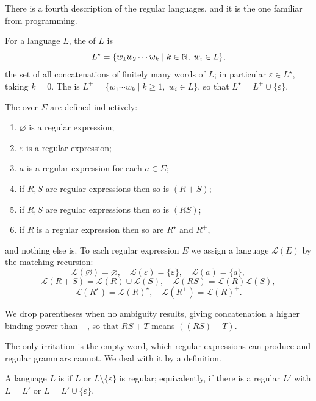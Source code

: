 \documentclass[a4paper]{scrartcl}
\newcommand{\lang}{\mathcal{L}}
\newcommand{\eps}{\varepsilon}
\begin{document}
There is a fourth description of the regular languages, and it is the one familiar from programming.

\begin{definition}
	For a language $L$, the  of $L$ is
	$$L^\star = \{w_1w_2\cdots w_k \mid k \in \mathbb{N},\; w_i \in L\},$$
	the set of all concatenations of finitely many words of $L$; in particular $\eps \in L^\star$, taking $k = 0$. The  is $L^+ = \{w_1\cdots w_k \mid k \geq 1,\; w_i \in L\}$, so that $L^\star = L^+ \cup \{\eps\}$.
\end{definition}

\begin{definition}
	The  over $\Sigma$ are defined inductively:
	\begin{enumerate}[label=(\roman*)]
		\item $\varnothing$ is a regular expression;
		\item $\eps$ is a regular expression;
		\item $a$ is a regular expression for each $a \in \Sigma$;
		\item if $R,S$ are regular expressions then so is $(R+S)$;
		\item if $R,S$ are regular expressions then so is $(RS)$;
		\item if $R$ is a regular expression then so are $R^\star$ and $R^+$,
	\end{enumerate}
	and nothing else is. To each regular expression $E$ we assign a language $\lang(E)$ by the matching recursion:
	$$\lang(\varnothing) = \varnothing, \quad \lang(\eps) = \{\eps\}, \quad \lang(a) = \{a\},$$
	$$\lang(R+S) = \lang(R)\cup\lang(S), \quad \lang(RS) = \lang(R)\lang(S),$$
	$$\lang(R^\star) = \lang(R)^\star, \quad \lang(R^+) = \lang(R)^+.$$
\end{definition}

We drop parentheses when no ambiguity results, giving concatenation a higher binding power than $+$, so that $RS + T$ means $((RS)+T)$.

The only irritation is the empty word, which regular expressions can produce and regular grammars cannot. We deal with it by a definition.

\begin{definition}
	A language $L$ is  if $L$ or $L \setminus \{\eps\}$ is regular; equivalently, if there is a regular $L'$ with $L = L'$ or $L = L' \cup \{\eps\}$.
\end{definition}
\end{document}
